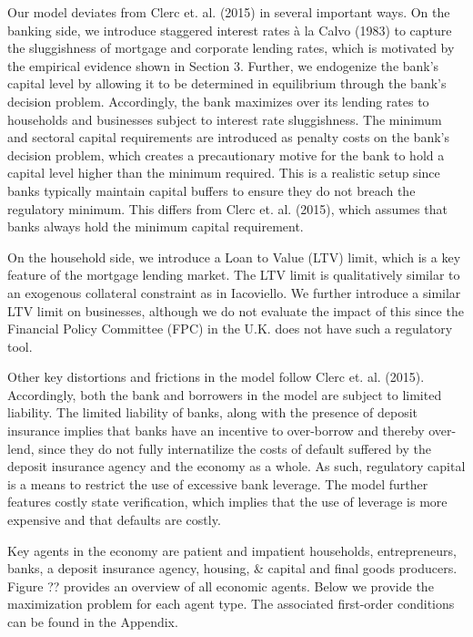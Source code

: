 \documentclass[12pt]{article}
\numberwithin{equation}{section}
\begin{document}
Our model deviates from Clerc et. al. (2015) in several important ways. On the banking side, we introduce staggered interest rates à la Calvo (1983) to capture the sluggishness of mortgage and corporate lending rates, which is motivated by the empirical evidence shown in Section 3. Further, we endogenize the bank's capital level by allowing it to be determined in equilibrium through the bank's decision problem. Accordingly, the bank maximizes over its lending rates to households and businesses subject to interest rate sluggishness. The minimum and sectoral capital requirements are introduced as penalty costs on the bank's decision problem, which creates a precautionary motive for the bank to hold a capital level higher than the minimum required. This is a realistic setup since banks typically maintain capital buffers to ensure they do not breach the regulatory minimum. This differs from Clerc et. al. (2015), which assumes that banks always hold the minimum capital requirement. 


On the household side, we introduce a Loan to Value (LTV) limit, which is a key feature of the mortgage lending market. The LTV limit is qualitatively similar to an exogenous collateral constraint as in Iacoviello. We further introduce a similar LTV limit on businesses, although we do not evaluate the impact of this since the Financial Policy Committee (FPC) in the U.K. does not have such a regulatory tool.


Other key distortions and frictions in the model follow Clerc et. al. (2015). Accordingly, both the bank and borrowers in the model are subject to limited liability. The limited liability of banks, along with the presence of deposit insurance implies that banks have an incentive to over-borrow and thereby over-lend, since they do not fully internatilize the costs of default suffered by the deposit insurance agency and the economy as a whole. As such, regulatory capital is a means to restrict the use of excessive bank leverage. The model further features costly state verification, which implies that the use of leverage is more expensive and that defaults are costly. 


Key agents in the economy are patient and impatient households, entrepreneurs, banks, a deposit insurance agency, housing, \& capital and final goods producers. Figure ?? provides an overview of all economic agents. Below we provide the maximization problem for each agent type. The associated first-order conditions can be found in the Appendix. 
\end{document}
